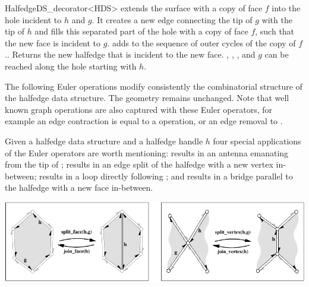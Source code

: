 \begin{ccRefClass}{HalfedgeDS_decorator<HDS>}
   {extends the surface with a copy of face $f$ into the hole 
    incident to $h$ and $g$. It creates a new edge connecting the tip of
    $g$ with the tip of $h$ and fills this separated part of the hole with a
    copy of face $f$, such that the new face is incident to $g$.
    {\XHDS adds  to the sequence of outer cycles of the copy of $f$.}.
    Returns the new halfedge that is incident to the new face.
    \ccPrecond {}, ,
    ,  and $g$ can be reached 
    along the hole starting with $h$.}



The following Euler operations modify consistently the combinatorial
structure of the halfedge data structure. The geometry remains unchanged.
Note that well known graph operations are also captured with these 
Euler operators, for example an edge contraction is equal to a
 operation, or an edge removal to .

Given a halfedge data structure  and a halfedge handle $h$
four special applications of the Euler operators are worth mentioning:
 results in an antenna emanating from the tip
of ;  results in an edge 
split of the halfedge  with a new vertex in-between;
 results in a loop directly following ;
and  results in a bridge parallel to
the halfedge  with a new face in-between.

\begin{ccTexOnly}
    \begin{center}
      \parbox{\textwidth}{%
          \includegraphics[width=\textwidth]{HalfedgeDS_ref/fig/euler_hds}%
      }
    \end{center}
\end{ccTexOnly}


\end{ccRefClass}
